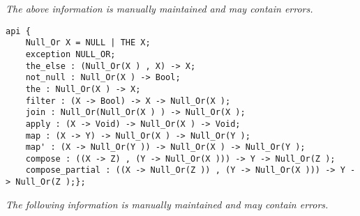 \label{api:Null\_Or}

{\tiny \it The above information is manually maintained and may contain errors.}
\begin{verbatim}
api {
    Null_Or X = NULL | THE X;
    exception NULL_OR;
    the_else : (Null_Or(X ) , X) -> X;
    not_null : Null_Or(X ) -> Bool;
    the : Null_Or(X ) -> X;
    filter : (X -> Bool) -> X -> Null_Or(X );
    join : Null_Or(Null_Or(X ) ) -> Null_Or(X );
    apply : (X -> Void) -> Null_Or(X ) -> Void;
    map : (X -> Y) -> Null_Or(X ) -> Null_Or(Y );
    map' : (X -> Null_Or(Y )) -> Null_Or(X ) -> Null_Or(Y );
    compose : ((X -> Z) , (Y -> Null_Or(X ))) -> Y -> Null_Or(Z );
    compose_partial : ((X -> Null_Or(Z )) , (Y -> Null_Or(X ))) -> Y -> Null_Or(Z );};
\end{verbatim}
{\tiny \it The following information is manually maintained and may contain errors.}

